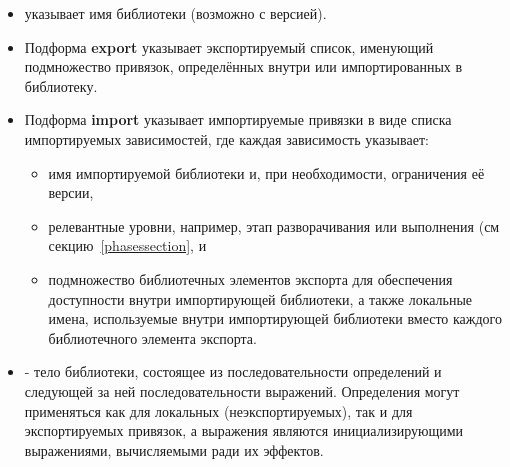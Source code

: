 \begin{itemize}
\item {} указывает имя библиотеки (возможно с версией).
\item Подформа {\cf\bfseries export} указывает экспортируемый список, именующий подмножество
  привязок, определённых внутри или импортированных в библиотеку.
\item Подформа {\cf\bfseries import} указывает импортируемые привязки в виде списка
  импортируемых зависимостей, где каждая зависимость указывает:
\begin{itemize}
\item имя импортируемой библиотеки и, при необходимости, ограничения её версии,
\item релевантные уровни, например, этап разворачивания или выполнения (см
  секцию~\ref{phasessection}, и
\item подмножество библиотечных элементов экспорта для обеспечения доступности внутри
  импортирующей библиотеки, а также локальные имена, используемые внутри импортирующей
  библиотеки вместо каждого библиотечного элемента экспорта.
\end{itemize}
\item {} - тело библиотеки, состоящее из последовательности определений
  и следующей за ней последовательности выражений. Определения могут применяться как для локальных
  (неэкспортируемых), так и для экспортируемых привязок, а выражения являются
  инициализирующими выражениями, вычисляемыми ради их эффектов.
\end{itemize}\vspace{-1mm}


